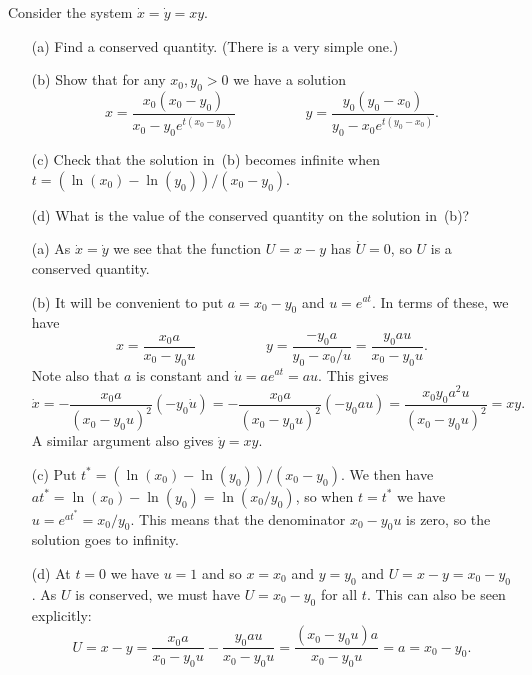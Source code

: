 \documentclass[a4paper]{amsart}
\begin{document}
\begin{exercise}\label{ex-xy}
 Consider the system $\dot{x}=\dot{y}=xy$. 
 \begin{itemize}
  \item[(a)] Find a conserved quantity.  (There is a very simple one.)
  \item[(b)] Show that for any $x_0,y_0>0$ we have a solution 
   \[ x = \frac{x_0(x_0-y_0)}{x_0-y_0e^{t(x_0-y_0)}} 
      \hspace{5em}
      y = \frac{y_0(y_0-x_0)}{y_0-x_0e^{t(y_0-x_0)}}. 
   \]
  \item[(c)] Check that the solution in~(b) becomes infinite when 
   $t=(\ln(x_0)-\ln(y_0))/(x_0-y_0)$.
  \item[(d)] What is the value of the conserved quantity on the
   solution in~(b)?
 \end{itemize}
\end{exercise}
\begin{solution}
 \begin{itemize}
  \item[(a)] As $\dot{x}=\dot{y}$ we see that the function $U=x-y$ has
   $\dot{U}=0$, so $U$ is a conserved quantity.
  \item[(b)] It will be convenient to put $a=x_0-y_0$ and $u=e^{at}$.
   In terms of these, we have 
   \[ x = \frac{x_0a}{x_0-y_0u} \hspace{5em}
      y = \frac{-y_0a}{y_0-x_0/u} 
        = \frac{y_0au}{x_0-y_0u}.
   \]
   Note also that $a$ is constant and $\dot{u}=ae^{at}=au$.  This
   gives
   \[ \dot{x} =
       -\frac{x_0a}{(x_0-y_0u)^2}(-y_0\dot{u}) = 
       -\frac{x_0a}{(x_0-y_0u)^2}(-y_0au) = 
        \frac{x_0y_0a^2u}{(x_0-y_0u)^2} = xy.
   \]
   A similar argument also gives $\dot{y}=xy$.
  \item[(c)] Put $t^*=(\ln(x_0)-\ln(y_0))/(x_0-y_0)$.  We then have
   $at^*=\ln(x_0)-\ln(y_0)=\ln(x_0/y_0)$, so when $t=t^*$ we have
   $u=e^{at^*}=x_0/y_0$.  This means that the denominator $x_0-y_0u$
   is zero, so the solution goes to infinity.
  \item[(d)] At $t=0$ we have $u=1$ and so $x=x_0$ and $y=y_0$ and
   $U=x-y=x_0-y_0$.  As $U$ is conserved, we must have $U=x_0-y_0$ for
   all $t$.  This can also be seen explicitly:
   \[ U = x-y = \frac{x_0a}{x_0-y_0u} - \frac{y_0au}{x_0-y_0u}
         = \frac{(x_0-y_0u)a}{x_0-y_0u} = a = x_0-y_0.
   \] 
 \end{itemize}
\end{solution}
\end{document}
